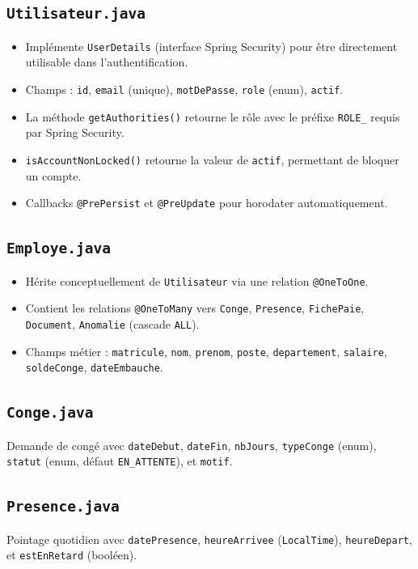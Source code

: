 \documentclass[a4paper,12pt]{report}
\begin{document}
\subsection{\texttt{Utilisateur.java}}
\begin{itemize}
  \item Implémente \texttt{UserDetails} (interface Spring Security) pour être directement utilisable dans l'authentification.
  \item Champs : \texttt{id}, \texttt{email} (unique), \texttt{motDePasse}, \texttt{role} (enum), \texttt{actif}.
  \item La méthode \texttt{getAuthorities()} retourne le rôle avec le préfixe \texttt{ROLE\_} requis par Spring Security.
  \item \texttt{isAccountNonLocked()} retourne la valeur de \texttt{actif}, permettant de bloquer un compte.
  \item Callbacks \texttt{@PrePersist} et \texttt{@PreUpdate} pour horodater automatiquement.
\end{itemize}

\subsection{\texttt{Employe.java}}
\begin{itemize}
  \item Hérite conceptuellement de \texttt{Utilisateur} via une relation \texttt{@OneToOne}.
  \item Contient les relations \texttt{@OneToMany} vers \texttt{Conge}, \texttt{Presence}, \texttt{FichePaie}, \texttt{Document}, \texttt{Anomalie} (cascade \texttt{ALL}).
  \item Champs métier : \texttt{matricule}, \texttt{nom}, \texttt{prenom}, \texttt{poste}, \texttt{departement}, \texttt{salaire}, \texttt{soldeConge}, \texttt{dateEmbauche}.
\end{itemize}

\subsection{\texttt{Conge.java}}
Demande de congé avec \texttt{dateDebut}, \texttt{dateFin}, \texttt{nbJours}, \texttt{typeConge} (enum), \texttt{statut} (enum, défaut \texttt{EN\_ATTENTE}), et \texttt{motif}.

\subsection{\texttt{Presence.java}}
Pointage quotidien avec \texttt{datePresence}, \texttt{heureArrivee} (\texttt{LocalTime}), \texttt{heureDepart}, et \texttt{estEnRetard} (booléen).
\end{document}
